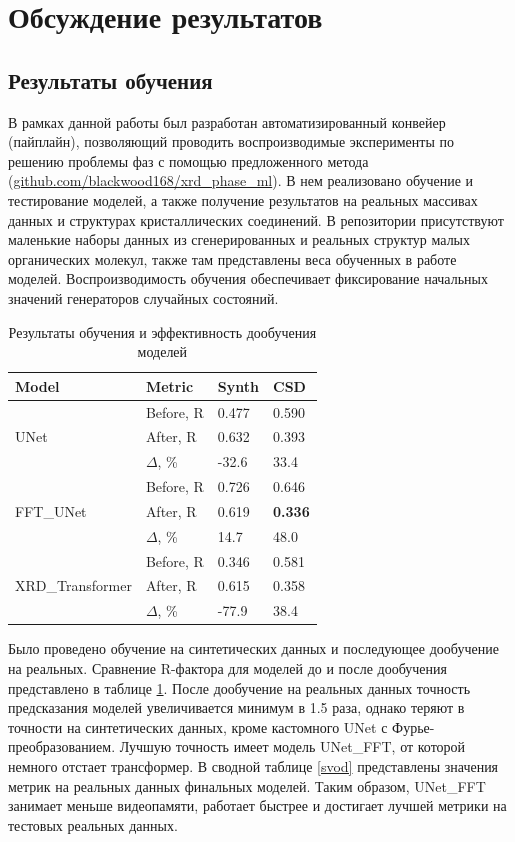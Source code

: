 \section{Обсуждение результатов}

\subsection{Результаты обучения}

В рамках данной работы был разработан автоматизированный конвейер (пайплайн), позволяющий проводить воспроизводимые эксперименты по решению проблемы фаз с помощью предложенного метода (\url{github.com/blackwood168/xrd_phase_ml}). В нем реализовано обучение и тестирование моделей, а также получение результатов на реальных массивах данных и структурах кристаллических соединений. В репозитории присутствуют маленькие наборы данных из сгенерированных и реальных структур малых органических молекул, также там представлены веса обученных в работе моделей. Воспроизводимость обучения обеспечивает фиксирование начальных значений генераторов случайных состояний.

\begin{table}[H]
\caption{Результаты обучения и эффективность дообучения моделей}
\label{doposle}
\centering
\footnotesize
\begin{tabular}{|l|l|l|l|} 
\hline
\textbf{Model} & \textbf{Metric} & \textbf{Synth} & \textbf{CSD}  \\ 
\hline
\multirow{3}{*}{UNet} 
& Before, R & 0.477 & 0.590 \\ 
& After, R  & 0.632 & 0.393 \\ 
& $\Delta$, \%       & -32.6 & 33.4  \\
\hline
\multirow{3}{*}{FFT\_UNet}
& Before, R & 0.726 & 0.646 \\ 
& After, R  & 0.619 & \textbf{0.336} \\ 
& $\Delta$, \%       & 14.7  & 48.0  \\
\hline
\multirow{3}{*}{XRD\_Transformer}
& Before, R & 0.346 & 0.581 \\ 
& After, R  & 0.615 & 0.358 \\ 
& $\Delta$, \%       & -77.9 & 38.4  \\
\hline
\end{tabular}
\end{table}

Было проведено обучение на синтетических данных и последующее дообучение на реальных. Сравнение R-фактора для моделей до и после дообучения представлено в таблице \ref{doposle}. После дообучение на реальных данных точность предсказания моделей увеличивается минимум в 1.5 раза, однако теряют в точности на синтетических данных, кроме кастомного UNet с Фурье-преобразованием. Лучшую точность имеет модель UNet\_FFT, от которой немного отстает трансформер. В сводной таблице \ref{svod} представлены значения метрик на реальных данных финальных моделей. Таким образом, UNet\_FFT занимает меньше видеопамяти, работает быстрее и достигает лучшей метрики на тестовых реальных данных.

